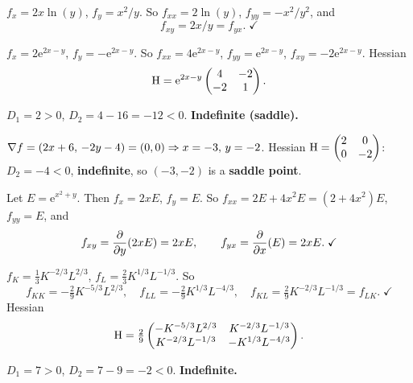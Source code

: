 \begin{solutions}
  \item $f_x = 2x\ln(y)$, $f_y = x^{2}/y$. So $f_{xx} = 2\ln(y)$,
        $f_{yy} = -x^{2}/y^{2}$, and
        \[
          f_{xy} = 2x/y = f_{yx} . \; \checkmark
        \]

  \item $f_x = 2\mathrm{e}^{2x-y}$, $f_y = -\mathrm{e}^{2x-y}$. So
        $f_{xx} = 4\mathrm{e}^{2x-y}$, $f_{yy} = \mathrm{e}^{2x-y}$,
        $f_{xy} = -2\mathrm{e}^{2x-y}$. Hessian
        \[
          \operatorname{H} = \mathrm{e}^{2x-y}\begin{pmatrix}4&-2\\-2&1\end{pmatrix} .
        \]

  \item $D_1 = 2 > 0$, $D_2 = 4 - 16 = -12 < 0$. \textbf{Indefinite
        (saddle).}

  \item $\nabla f = (2x+6,\,-2y-4) = (0,0) \Rightarrow x=-3,\,y=-2$. Hessian
        $\operatorname{H} = \begin{pmatrix}2&0\\0&-2\end{pmatrix}$: $D_2 = -4 < 0$,
        \textbf{indefinite}, so $(-3,-2)$ is a \textbf{saddle point}.

  \item Let $E = \mathrm{e}^{x^{2}+y}$. Then $f_x = 2xE$, $f_y = E$. So
        $f_{xx} = 2E + 4x^{2}E = (2+4x^{2})E$, $f_{yy} = E$, and
        \[
          f_{xy} = \frac{\partial }{\partial y}(2xE) = 2xE, \qquad
          f_{yx} = \frac{\partial }{\partial x}(E) = 2xE . \; \checkmark
        \]

  \item $f_K = \tfrac13K^{-2/3}L^{2/3}$, $f_L = \tfrac23K^{1/3}L^{-1/3}$.
        So
        \[
          f_{KK} = -\tfrac29K^{-5/3}L^{2/3}, \quad
          f_{LL} = -\tfrac29K^{1/3}L^{-4/3}, \quad
          f_{KL} = \tfrac29K^{-2/3}L^{-1/3} = f_{LK} . \; \checkmark
        \]
        Hessian
        \[
          \operatorname{H} = \tfrac29
          \begin{pmatrix}
            -K^{-5/3}L^{2/3} & K^{-2/3}L^{-1/3} \\
            K^{-2/3}L^{-1/3} & -K^{1/3}L^{-4/3}
          \end{pmatrix} .
        \]

  \item $D_1 = 7 > 0$, $D_2 = 7 - 9 = -2 < 0$. \textbf{Indefinite.}


\end{solutions}
